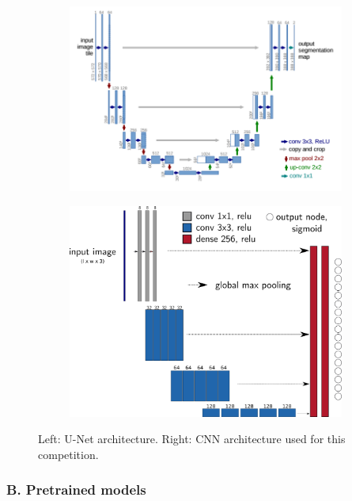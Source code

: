 \documentclass[fleqn]{homework}
\begin{document}
\begin{figure}[H]
\centering
   \begin{subfigure}{0.48\linewidth}
      \centering
	  \includegraphics[width=1\linewidth]{figures/UNet.png}
      \caption{}
   \end{subfigure}
   \begin{subfigure}{0.48\linewidth}
      \centering
	  \includegraphics[width=1\linewidth]{figures/Simplenet.png}
      \caption{}
   \end{subfigure}
  \caption{Left: U-Net architecture. Right: CNN architecture used for this competition.}
	\label{UNet} 
\end{figure}

\subsubsection*{B. Pretrained models}
\end{document}
